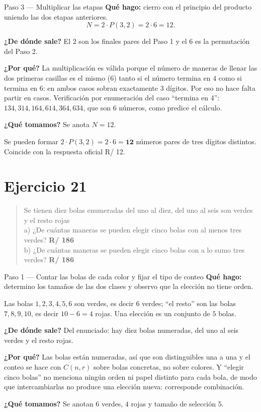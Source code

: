 \documentclass[11pt]{article}
\begin{document}
\begin{paso}{Paso 3 --- Multiplicar las etapas}
\textbf{Qué hago:} cierro con el principio del producto uniendo las dos etapas anteriores.
\[
  N = 2\cdot P(3,2) = 2\cdot 6 = 12 .
\]

\textbf{¿De dónde sale?} El $2$ son los finales pares del Paso 1 y el $6$ es la permutación del Paso 2.

\textbf{¿Por qué?} La multiplicación es válida porque el número de maneras de llenar las dos primeras casillas es el mismo ($6$) tanto si el número termina en $4$ como si termina en $6$: en ambos casos sobran exactamente $3$ dígitos. Por eso no hace falta partir en casos. Verificación por enumeración del caso ``termina en 4'': $134,314,164,614,364,634$, que son $6$ números, como predice el cálculo.

\textbf{¿Qué tomamos?} Se anota $N=12$.
\end{paso}

\begin{resp}
Se pueden formar $2\cdot P(3,2)=2\cdot 6=\mathbf{12}$ números pares de tres dígitos distintos. Coincide con la respuesta oficial R/ 12.
\end{resp}

\section*{Ejercicio 21}

\begin{quote}
Se tienen diez bolas enumeradas del uno al diez, del uno al seis son verdes y el resto rojas\\[2pt]
a) ¿De cuántas maneras se pueden elegir cinco bolas con al menos tres verdes? \quad \textbf{R/ 186}\\
b) ¿De cuántas maneras se pueden elegir cinco bolas con a lo sumo tres verdes? \quad \textbf{R/ 186}
\end{quote}

\begin{paso}{Paso 1 --- Contar las bolas de cada color y fijar el tipo de conteo}
\textbf{Qué hago:} determino los tamaños de las dos clases y observo que la elección no tiene orden.

Las bolas $1,2,3,4,5,6$ son verdes, es decir $6$ verdes; ``el resto'' son las bolas $7,8,9,10$, es decir $10-6=4$ rojas. Una elección es un conjunto de $5$ bolas.

\textbf{¿De dónde sale?} Del enunciado: hay diez bolas numeradas, del uno al seis verdes y el resto rojas.

\textbf{¿Por qué?} Las bolas están numeradas, así que son distinguibles una a una y el conteo se hace con $C(n,r)$ sobre bolas concretas, no sobre colores. Y ``elegir cinco bolas'' no menciona ningún orden ni papel distinto para cada bola, de modo que intercambiarlas no produce una elección nueva: corresponde combinación.

\textbf{¿Qué tomamos?} Se anotan $6$ verdes, $4$ rojas y tamaño de selección $5$.
\end{paso}
\end{document}
